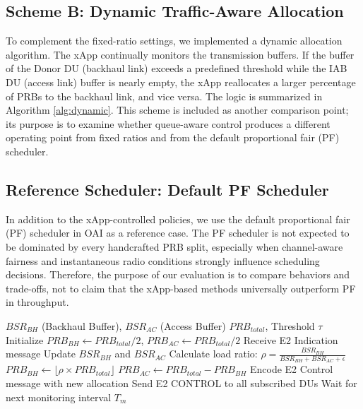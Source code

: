 \documentclass[conference, a4paper]{IEEEtran}
\begin{document}
\subsection{Scheme B: Dynamic Traffic-Aware Allocation}
To complement the fixed-ratio settings, we implemented a dynamic allocation algorithm. The xApp continually monitors the transmission buffers. If the buffer of the Donor DU (backhaul link) exceeds a predefined threshold while the IAB DU (access link) buffer is nearly empty, the xApp reallocates a larger percentage of PRBs to the backhaul link, and vice versa. The logic is summarized in Algorithm \ref{alg:dynamic}. This scheme is included as another comparison point; its purpose is to examine whether queue-aware control produces a different operating point from fixed ratios and from the default proportional fair (PF) scheduler.

\subsection{Reference Scheduler: Default PF Scheduler}
In addition to the xApp-controlled policies, we use the default proportional fair (PF) scheduler in OAI as a reference case. The PF scheduler is not expected to be dominated by every handcrafted PRB split, especially when channel-aware fairness and instantaneous radio conditions strongly influence scheduling decisions. Therefore, the purpose of our evaluation is to compare behaviors and trade-offs, not to claim that the xApp-based methods universally outperform PF in throughput.

\begin{algorithm}[htbp]
\caption{Dynamic Traffic-Aware PRB Allocation}
\label{alg:dynamic}
\begin{algorithmic}[1]
\REQUIRE $BSR_{BH}$ (Backhaul Buffer), $BSR_{AC}$ (Access Buffer)
\REQUIRE $PRB_{total}$, Threshold $\tau$
\STATE Initialize $PRB_{BH} \gets PRB_{total}/2$, $PRB_{AC} \gets PRB_{total}/2$
    \STATE Receive E2 Indication message
    \STATE Update $BSR_{BH}$ and $BSR_{AC}$
    \STATE Calculate load ratio: $\rho = \frac{BSR_{BH}}{BSR_{BH} + BSR_{AC} + \epsilon}$
        \STATE $PRB_{BH} \gets \lfloor \rho \times PRB_{total} \rfloor$
        \STATE $PRB_{AC} \gets PRB_{total} - PRB_{BH}$
        \STATE Encode E2 Control message with new allocation
        \STATE Send E2 CONTROL to all subscribed DUs
    \ENDIF
    \STATE Wait for next monitoring interval $T_m$
\ENDWHILE
\end{algorithmic}
\end{algorithm}
\end{document}
